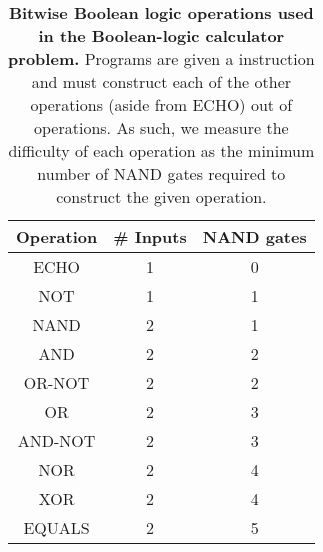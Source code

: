 
\begin{table}[ht!]
    \small
    \centering
    \begin{tabular}{c | c | c}
        \toprule
        Operation & \# Inputs & NAND gates \\ \hline 
        ECHO &
        1 &
        0
        \\
        NOT &
        1 &
        1
        \\
        NAND &
        2 &
        1
        \\
        AND &
        2 &
        2
        \\
        OR-NOT &
        2 &
        2
        \\
        OR &
        2 &
        3
        \\
        AND-NOT &
        2 &
        3
        \\
        NOR &
        2 &
        4
        \\
        XOR &
        2 &
        4
        \\
        EQUALS &
        2 &
        5
        \\
        \bottomrule
    \end{tabular}
    \caption{\small 
    \textbf{Bitwise Boolean logic operations used in the Boolean-logic calculator problem.} 
    Programs are given a  instruction and must construct each of the other operations (aside from ECHO) out of  operations.
    As such, we measure the difficulty of each operation as the minimum number of NAND gates required to construct the given operation.
    }
    \label{chapter:tag-based-regulation:tab:boolean-calc-operations}
\end{table}